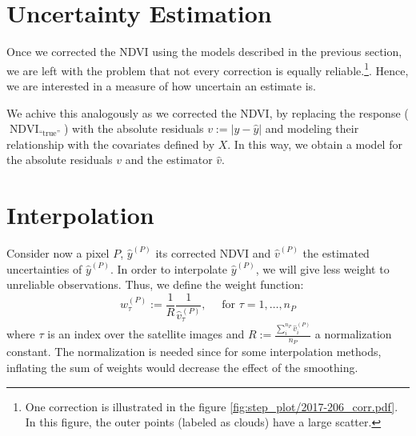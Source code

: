 \section{Uncertainty Estimation}{
    \label{sec:corr_uncertainty}
    Once we corrected the NDVI using the models described in the previous section, we are left with the problem that not every correction is equally reliable.\footnote{One correction is illustrated in the figure \ref{fig:step_plot/2017-206_corr.pdf}. In this figure, the outer points (labeled as clouds) have a large scatter.}. Hence, we are interested in a measure of how uncertain an estimate is. 

    We achive this analogously as we corrected the NDVI, by replacing the response ($\operatorname{NDVI}_\text{``true''}$) with the absolute residuals $v := \left|y -\hat y\right|$ and modeling their relationship with the covariates defined by $X$.  In this way, we obtain a model for the absolute residuals $v$ and the estimator $\hat v$.  
}

\section{Interpolation}{
    \label{sec:corr_link}
    Consider now a pixel $P$, $\hat y^{(P)}$ its corrected NDVI and $\hat v^{(P)}$ the estimated uncertainties of $\hat y^{(P)}$. In order to interpolate $\hat y^{(P)}$, we will give less weight to unreliable observations. Thus, we define the weight function: 
    \begin{equation}
        \label{eq:corr_link}
        w^{(P)}_\tau:=\frac{1}{R} \frac{1}{\hat v^{(P)}_\tau}, 
        \quad \text{ for } \tau=1,\dots, n_P
    \end{equation}  
    where $\tau$ is an index over the satellite images and $R:=\frac{\sum_i^{n_P}\hat v^{(P)}_i}{n_P}$ a normalization constant. The normalization is needed since for some interpolation methods, inflating the sum of weights would decrease the effect of the smoothing. 
}


